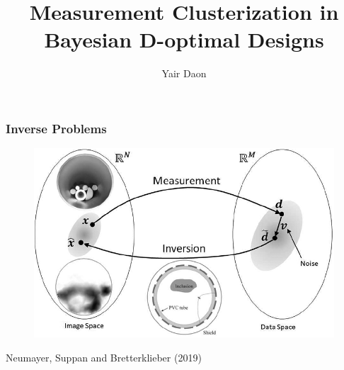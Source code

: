 \documentclass{beamer}
\title{Measurement Clusterization in Bayesian D-optimal Designs}
\author{Yair Daon}
\institute{Azrieli Faculty of Medicine, Bar-Ilan University}
\date{}
\begin{document}

\begin{frame}
  \titlepage
\end{frame}


\begin{frame}
  \frametitle{Inverse Problems}

  \begin{figure}
    \centering
    \includegraphics[width=\textwidth]{figs/inverse_problem.png}
  \end{figure}

  \footnotesize{Neumayer, Suppan and Bretterklieber (2019)}
\end{frame}
\end{document}
